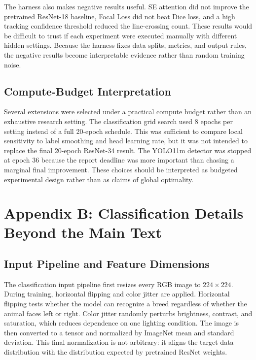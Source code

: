 \documentclass[10pt,twocolumn]{article}
\begin{document}
The harness also makes negative results useful. SE attention did not improve the pretrained ResNet-18 baseline, Focal Loss did not beat Dice loss, and a high tracking confidence threshold reduced the line-crossing count. These results would be difficult to trust if each experiment were executed manually with different hidden settings. Because the harness fixes data splits, metrics, and output rules, the negative results become interpretable evidence rather than random training noise.

\subsection{Compute-Budget Interpretation}

Several extensions were selected under a practical compute budget rather than an exhaustive research setting. The classification grid search used 8 epochs per setting instead of a full 20-epoch schedule. This was sufficient to compare local sensitivity to label smoothing and head learning rate, but it was not intended to replace the final 20-epoch ResNet-34 result. The YOLO11m detector was stopped at epoch 36 because the report deadline was more important than chasing a marginal final improvement. These choices should be interpreted as budgeted experimental design rather than as claims of global optimality.

\section{Appendix B: Classification Details Beyond the Main Text}

\subsection{Input Pipeline and Feature Dimensions}

The classification input pipeline first resizes every RGB image to $224 \times 224$. During training, horizontal flipping and color jitter are applied. Horizontal flipping tests whether the model can recognize a breed regardless of whether the animal faces left or right. Color jitter randomly perturbs brightness, contrast, and saturation, which reduces dependence on one lighting condition. The image is then converted to a tensor and normalized by ImageNet mean and standard deviation. This final normalization is not arbitrary: it aligns the target data distribution with the distribution expected by pretrained ResNet weights.
\end{document}
